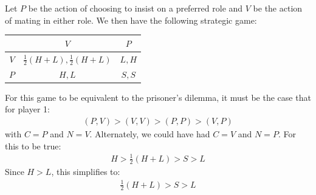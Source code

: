 \documentclass{article}
\begin{document}
\clearpage
\problem{}
Let $P$ be the action of choosing to insist on a preferred role and $V$ be the action of mating in either role. We then have the following strategic game:
\begin{center}
\begin{tabular}{|c|c|c|}
    \hline
     & $V$ & $P$ \\
     \hline
     $V$ & $\frac{1}{2}(H + L), \frac{1}{2}(H + L)$ & $L, H$ \\
     \hline
     $P$ & $H, L$ & $S, S$ \\
     \hline
\end{tabular}
\end{center}
For this game to be equivalent to the prisoner's dilemma, it must be the case that for player 1:
\begin{align*}
    (P, V) > (V, V) > (P, P) > (V, P)
\end{align*}
with $C = P$ and $N = V$. Alternately, we could have had $C = V$ and $N = P$. For this to be true:
\begin{align*}
    H > \frac{1}{2}(H + L) > S > L
\end{align*}
Since $H > L$, this simplifies to:
\begin{align*}
    \frac{1}{2}(H + L) > S > L
\end{align*}
\end{document}
